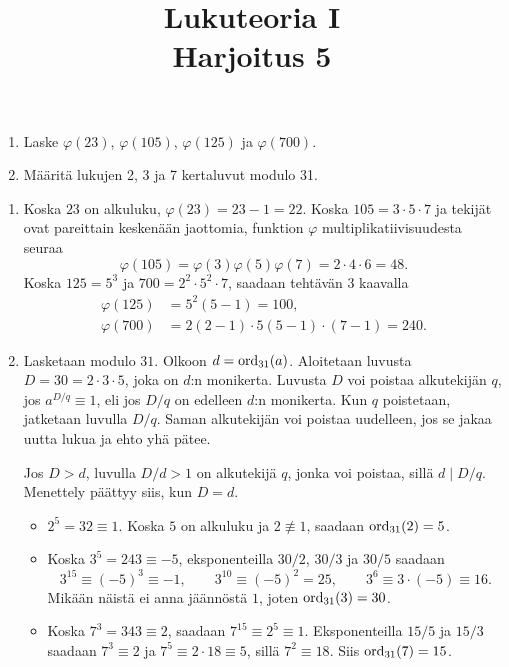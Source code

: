 \documentclass[11pt,a4paper]{amsart}
\title{Lukuteoria I\\Harjoitus 5}
\author{}
\date{}
\begin{document}

\begin{exercise}
  \leavevmode\par
  \begin{enumerate}[label=(\alph*), topsep=0.35em]
    \item Laske \(\varphi(23)\), \(\varphi(105)\), \(\varphi(125)\) ja
      \(\varphi(700)\).
    \item Määritä lukujen 2, 3 ja 7 kertaluvut modulo 31.
  \end{enumerate}
\end{exercise}

\begin{solution}
  \leavevmode\par
  \begin{enumerate}[label=(\alph*), topsep=0.35em]
    \item Koska \(23\) on alkuluku, \(\varphi(23) = 23 - 1 = 22\).
      Koska \(105 = 3 \cdot 5 \cdot 7\) ja tekijät ovat pareittain
      keskenään jaottomia, funktion \(\varphi\) multiplikatiivisuudesta seuraa
      \[
        \varphi(105) = \varphi(3)\varphi(5)\varphi(7)
        = 2 \cdot 4 \cdot 6 = 48.
      \]
      Koska \(125 = 5^3\) ja \(700 = 2^2 \cdot 5^2 \cdot 7\), saadaan
      tehtävän 3 kaavalla
      \begin{align*}
        \varphi(125) &= 5^2(5 - 1) = 100, \\
        \varphi(700) &= 2(2 - 1) \cdot 5(5 - 1) \cdot (7 - 1) = 240.
      \end{align*}
    \item Lasketaan modulo \(31\). Olkoon \(d=\operatorname{ord}_{31}(a)\).
      Aloitetaan luvusta \(D=30=2\cdot 3\cdot 5\), joka on \(d\):n monikerta.
      Luvusta \(D\) voi poistaa alkutekijän \(q\), jos
      \(a^{D/q}\equiv 1\), eli jos \(D/q\) on edelleen \(d\):n monikerta.
      Kun \(q\) poistetaan, jatketaan luvulla \(D/q\). Saman alkutekijän
      voi poistaa uudelleen, jos se jakaa uutta lukua ja ehto yhä pätee.

      Jos \(D>d\), luvulla \(D/d>1\) on alkutekijä \(q\), jonka voi
      poistaa, sillä \(d\mid D/q\). Menettely päättyy siis, kun \(D=d\).
      \begin{itemize}
        \item \(2^5=32\equiv 1\). Koska \(5\) on alkuluku ja
          \(2\not\equiv 1\), saadaan \(\operatorname{ord}_{31}(2)=5\).
        \item Koska \(3^5=243\equiv -5\), eksponenteilla \(30/2\),
          \(30/3\) ja \(30/5\) saadaan
          \[
            3^{15}\equiv(-5)^3\equiv -1, \qquad
            3^{10}\equiv(-5)^2=25, \qquad
            3^6\equiv 3\cdot(-5)\equiv 16.
          \]
          Mikään näistä ei anna jäännöstä \(1\), joten \(\operatorname{ord}_{31}(3)=30\).
        \item Koska \(7^3=343\equiv 2\), saadaan \(7^{15}\equiv 2^5\equiv 1\).
          Eksponenteilla \(15/5\) ja \(15/3\) saadaan \(7^3\equiv 2\)
          ja \(7^5\equiv 2\cdot 18\equiv 5\), sillä \(7^2\equiv 18\).
          Siis \(\operatorname{ord}_{31}(7)=15\).
      \end{itemize}
  \end{enumerate}
\end{solution}
\end{document}
